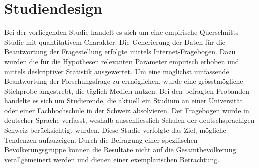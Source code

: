 %
%
\glsresetall
\let\raggedsection\centering
{}
\setcounter{chapter}{2}
\setcounter{section}{0}
\let\raggedsection\raggedright 
\section{Studiendesign}\label{section.studiendesign}
Bei der vorliegenden Studie handelt es sich um eine empirische Querschnitts-Studie mit quantitativem Charakter. Die Generierung der Daten für die Beantwortung der Fragestellung erfolgte mittels Internet-Fragebogen. Dazu wurden die für die Hypothesen relevanten Parameter empirisch erhoben und mittels deskriptiver Statistik ausgewertet. Um eine möglichst umfassende Beantwortung der Forschungsfrage zu ermöglichen, wurde eine grösstmögliche Stichprobe angestrebt, die täglich Medien nutzen. Bei den befragten Probanden handelte es sich um Studierende, die aktuell ein Studium an einer Universität oder einer Fachhochschule in der Schweiz absolvieren. Der Fragebogen wurde in deutscher Sprache verfasst, weshalb ausschliesslich Schulen der deutschsprachigen Schweiz berücksichtigt wurden. Diese Studie verfolgte das Ziel, mögliche Tendenzen aufzuzeigen. Durch die Befragung einer spezifischen Bevölkerungsgruppe können die Resultate nicht auf die Gesamtbevölkerung verallgemeinert werden und dienen einer exemplarischen Betrachtung.


